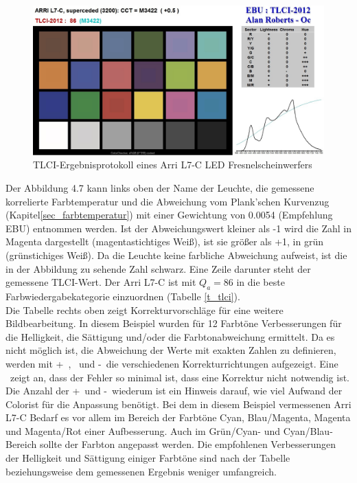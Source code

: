 \begin{figure}[htp]     %
\centering
\includegraphics[width=1.0\textwidth]{bilder/tlci2} 
\caption {TLCI-Ergebnisprotokoll eines Arri L7-C LED Fresnelscheinwerfers\protect\footnotemark}\label{b_tlci2}
\end{figure}
\noindent Der Abbildung 4.7 kann links oben der Name der Leuchte, die gemessene korrelierte Farbtemperatur und die Abweichung vom Plank'schen Kurvenzug (Kapitel\ref{sec_farbtemperatur}) mit einer Gewichtung von 0.0054 (Empfehlung EBU) entnommen werden. Ist der Abweichungswert kleiner als -1 wird die Zahl in Magenta dargestellt (magentastichtiges Weiß), ist sie größer als +1, in grün (grünstichiges Weiß). Da die Leuchte keine farbliche Abweichung aufweist, ist die in der Abbildung zu sehende Zahl schwarz. Eine Zeile darunter steht der gemessene TLCI-Wert. Der Arri L7-C ist mit $Q_{a}=86$ in die beste Farbwiedergabekategorie einzuordnen (Tabelle \ref{t_tlci}).\\
Die Tabelle rechts oben zeigt Korrekturvorschläge für eine weitere Bildbearbeitung. In diesem Beispiel wurden für 12 Farbtöne Verbesserungen für die Helligkeit, die Sättigung und/oder die Farbtonabweichung ermittelt. Da es nicht möglich ist, die Abweichung der Werte mit exakten Zahlen zu definieren, werden mit \glqq +\grqq\ , \grqq\ und \glqq -\grqq\ die verschiedenen Korrekturrichtungen aufgezeigt. Eine \grqq\ zeigt an, dass der Fehler so minimal ist, dass eine Korrektur nicht notwendig ist. Die Anzahl der \glqq +\grqq\ und \glqq -\grqq\ wiederum ist ein Hinweis darauf, wie viel Aufwand der Colorist für die Anpassung benötigt. Bei dem in diesem Beispiel vermessenen Arri L7-C Bedarf es vor allem im Bereich der Farbtöne Cyan, Blau/Magenta, Magenta und Magenta/Rot einer Aufbesserung. Auch im Grün/Cyan- und Cyan/Blau-Bereich sollte der Farbton angepasst werden. Die empfohlenen Verbesserungen der Helligkeit und Sättigung einiger Farbtöne sind nach der Tabelle beziehungsweise dem gemessenen Ergebnis weniger umfangreich.\\
